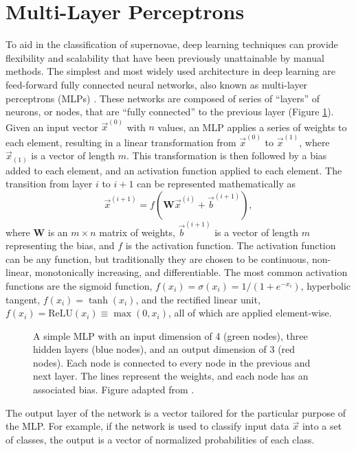 \section{Multi-Layer Perceptrons}\label{sec:MLP}
To aid in the classification of supernovae, deep learning techniques can provide 
flexibility and scalability that have been previously unattainable by manual 
methods. The simplest and most widely used architecture in deep learning are feed-forward 
fully connected neural networks, also known as multi-layer perceptrons (MLPs) \parencite{popescu2009}.
These networks are composed of series of ``layers'' of neurons, or nodes, that 
are ``fully connected'' to the previous layer (Figure \ref{fig:MLP}).
Given an input vector $\vec{x}^{(0)}$ with $n$ values, an MLP applies a series of weights to each 
element, resulting in a linear transformation from $\vec{x}^{(0)}$ to $\vec{x}^{(1)}$, where
$\vec{x}_{(1)}$ is a vector of length $m$. This transformation is then followed by a bias added 
to each element, and an activation function applied to each element.
The transition from layer $i$ to $i+1$ can be represented mathematically as 
\begin{equation}\label{eqn:MLP}
    \vec{x}^{(i+1)} = f(\mathbf{W}\vec{x}^{(i)} + \vec{b}^{(i+1)}),
\end{equation}
where $\mathbf{W}$ is an $m \times n$ matrix of weights, $\vec{b}^{(i+1)}$ is a vector of length $m$
representing the bias, and $f$ is the activation function. The activation function can 
be any function, but traditionally they are chosen to be continuous, non-linear, 
monotonically increasing, and differentiable. The most common activation functions 
are the sigmoid function, $f(x_i) = \sigma(x_i) = 1/(1 + e^{-x_i})$, hyperbolic tangent, 
$f(x_i) = \tanh(x_i)$, and the rectified linear unit,
$f(x_i) = \mathrm{ReLU}(x_i) \equiv \max(0,x_i)$, all of which are applied element-wise.
\begin{figure}[t]
    \centering
    
    \caption[Diagram of a Multi-Layered Perceptron]{A simple MLP with an input dimension of 4 (green nodes), three hidden layers (blue nodes), and an output dimension of 3 (red nodes). Each node is connected to every 
    node in the previous and next layer. The lines represent the weights, and each 
    node has an associated bias. Figure adapted from \textcite{neutelings2021_nn}.}
    \label{fig:MLP}
\end{figure}
The output layer of the network is a vector tailored for the particular purpose
of the MLP. For example, if the network is used to classify input data $\vec{x}$ into a set of classes, the output is a vector of normalized probabilities of each class. 

